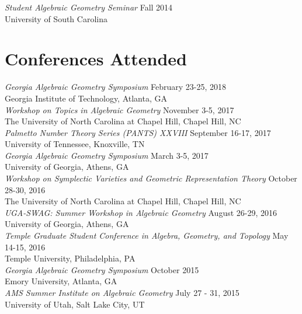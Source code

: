 \documentclass{article}
\begin{document}
\noindent\textsl{Student Algebraic Geometry Seminar} \hfill Fall 2014\\
University of South Carolina

\section*{Conferences Attended}
\textsl{Georgia Algebraic Geometry Symposium} \hfill February 23-25, 2018\\
Georgia Institute of Technology, Atlanta, GA\\

\noindent\textsl{Workshop on Topics in Algebraic Geometry} \hfill November 3-5, 2017\\
The University of North Carolina at Chapel Hill, Chapel Hill, NC\\

\noindent\textsl{Palmetto Number Theory Series (PANTS) XXVIII} \hfill September 16-17, 2017\\
University of Tennessee, Knoxville, TN\\

\noindent\textsl{Georgia Algebraic Geometry Symposium} \hfill March 3-5, 2017\\
University of Georgia, Athens, GA\\

\noindent\textsl{Workshop on Symplectic Varieties and Geometric Representation Theory} \hfill October 28-30, 2016\\
The University of North Carolina at Chapel Hill, Chapel Hill, NC\\

\noindent\textsl{UGA-SWAG: Summer Workshop in Algebraic Geometry} \hfill August 26-29, 2016\\
University of Georgia, Athens, GA\\

\noindent\textsl{Temple Graduate Student Conference in Algebra, Geometry, and Topology} \hfill May 14-15, 2016\\
Temple University, Philadelphia, PA\\

\noindent\textsl{Georgia Algebraic Geometry Symposium} \hfill October 2015\\
Emory University, Atlanta, GA\\

\noindent\textsl{AMS Summer Institute on Algebraic Geometry} \hfill July 27 - 31, 2015\\
University of Utah, Salt Lake City, UT\\
\end{document}
